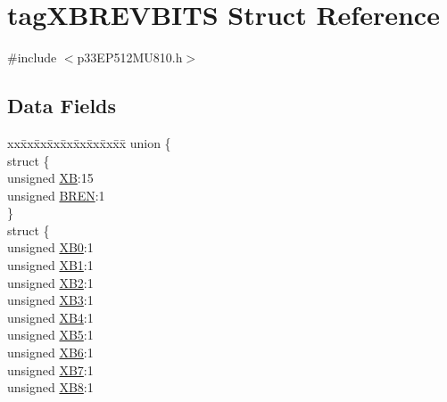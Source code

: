 \hypertarget{structtag_x_b_r_e_v_b_i_t_s}{}\section{tag\+X\+B\+R\+E\+V\+B\+I\+TS Struct Reference}
\label{structtag_x_b_r_e_v_b_i_t_s}


{\ttfamily \#include $<$p33\+E\+P512\+M\+U810.\+h$>$}

\subsection*{Data Fields}
\begin{DoxyCompactItemize}
\item 
\begin{tabbing}
xx\=xx\=xx\=xx\=xx\=xx\=xx\=xx\=xx\=\kill
union \{\\
\>struct \{\\
\>\>unsigned \hyperlink{structtag_x_b_r_e_v_b_i_t_s_a2725d12e714e7cb60148b5f77744b7dd}{XB}:15\\
\>\>unsigned \hyperlink{structtag_x_b_r_e_v_b_i_t_s_acd7eac8da0f3c4bd53f634c978510b63}{BREN}:1\\
\>\} \\
\>struct \{\\
\>\>unsigned \hyperlink{structtag_x_b_r_e_v_b_i_t_s_adb07b37558edc1f9b071562c311e5798}{XB0}:1\\
\>\>unsigned \hyperlink{structtag_x_b_r_e_v_b_i_t_s_aabd2fe8cf76370164ed6f799c6a8c01d}{XB1}:1\\
\>\>unsigned \hyperlink{structtag_x_b_r_e_v_b_i_t_s_aa29be5434f2f4a45e83844261a0cfa3c}{XB2}:1\\
\>\>unsigned \hyperlink{structtag_x_b_r_e_v_b_i_t_s_aa889c67aed45862495e8f76892cb65c5}{XB3}:1\\
\>\>unsigned \hyperlink{structtag_x_b_r_e_v_b_i_t_s_a4aec2e905283c8b2b03a7bb25bdf7a6e}{XB4}:1\\
\>\>unsigned \hyperlink{structtag_x_b_r_e_v_b_i_t_s_a1ef6a6b7254203e40e616988c157a8ec}{XB5}:1\\
\>\>unsigned \hyperlink{structtag_x_b_r_e_v_b_i_t_s_a68dd6173aaa121fecdc00c5c5ecb9761}{XB6}:1\\
\>\>unsigned \hyperlink{structtag_x_b_r_e_v_b_i_t_s_ae6624eb8661a89eb78ea3280fef4e11f}{XB7}:1\\
\>\>unsigned \hyperlink{structtag_x_b_r_e_v_b_i_t_s_a87dfc5686fb5b4e55a46253a210a578f}{XB8}:1\\

\end{tabbing}
\end{DoxyCompactItemize}
